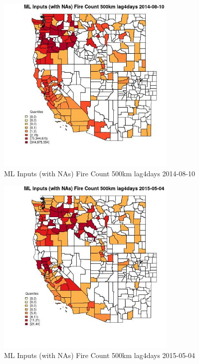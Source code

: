 \begin{figure} 
\centering  
\includegraphics[width=0.77\textwidth]{Code_Outputs/Report_ML_input_PM25_Step4_part_e_de_duplicated_aves_compiled_2019-05-18wNAs_CountyFire_Count_500km_lag4daysMean2014-08-10_2014-08-10.jpg} 
\caption{\label{fig:Report_ML_input_PM25_Step4_part_e_de_duplicated_aves_compiled_2019-05-18wNAsCountyFire_Count_500km_lag4daysMean2014-08-10_2014-08-10}ML Inputs (with NAs) Fire Count 500km lag4days 2014-08-10} 
\end{figure} 
 

\begin{figure} 
\centering  
\includegraphics[width=0.77\textwidth]{Code_Outputs/Report_ML_input_PM25_Step4_part_e_de_duplicated_aves_compiled_2019-05-18wNAs_CountyFire_Count_500km_lag4daysMean2015-05-04_2015-05-04.jpg} 
\caption{\label{fig:Report_ML_input_PM25_Step4_part_e_de_duplicated_aves_compiled_2019-05-18wNAsCountyFire_Count_500km_lag4daysMean2015-05-04_2015-05-04}ML Inputs (with NAs) Fire Count 500km lag4days 2015-05-04} 
\end{figure} 
 

